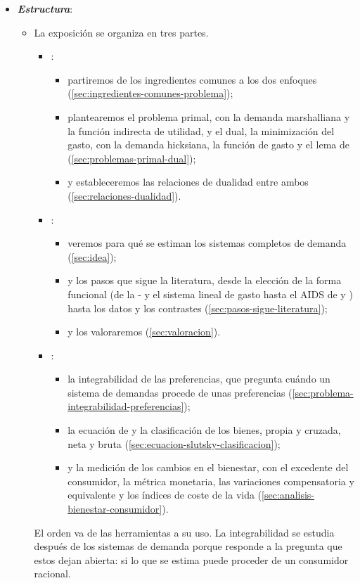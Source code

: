 \documentclass[11pt]{article}
\begin{document}
\begin{itemize}
\item \textbf{\emph{Estructura}}:
  \begin{itemize}
  \item La exposición se organiza en tres partes.
  \begin{itemize}
  \item {}:
    \begin{itemize}
    \item partiremos de los ingredientes comunes a los dos enfoques (\ref{sec:ingredientes-comunes-problema});
    \item plantearemos el problema primal, con la demanda marshalliana y la función indirecta de utilidad, y el dual, la minimización del gasto, con la demanda hicksiana, la función de gasto y el lema de  (\ref{sec:problemas-primal-dual});
    \item y estableceremos las relaciones de dualidad entre ambos (\ref{sec:relaciones-dualidad}).
    \end{itemize}
  \item {}:
    \begin{itemize}
    \item veremos para qué se estiman los sistemas completos de demanda (\ref{sec:idea});
    \item y los pasos que sigue la literatura, desde la elección de la forma funcional (de la - y el sistema lineal de gasto hasta el AIDS de  y ) hasta los datos y los contrastes (\ref{sec:pasos-sigue-literatura});
    \item y los valoraremos (\ref{sec:valoracion}).
    \end{itemize}
  \item {}:
    \begin{itemize}
    \item la integrabilidad de las preferencias, que pregunta cuándo un sistema de demandas procede de unas preferencias (\ref{sec:problema-integrabilidad-preferencias});
    \item la ecuación de  y la clasificación de los bienes, propia y cruzada, neta y bruta (\ref{sec:ecuacion-slutsky-clasificacion});
    \item y la medición de los cambios en el bienestar, con el excedente del consumidor, la métrica monetaria, las variaciones compensatoria y equivalente y los índices de coste de la vida (\ref{sec:analisis-bienestar-consumidor}).
    \end{itemize}
  \end{itemize}
  El orden va de las herramientas a su uso. La integrabilidad se estudia después de los sistemas de demanda porque responde a la pregunta que estos dejan abierta: si lo que se estima puede proceder de un consumidor racional.
  \end{itemize}
\end{itemize}
\end{document}

